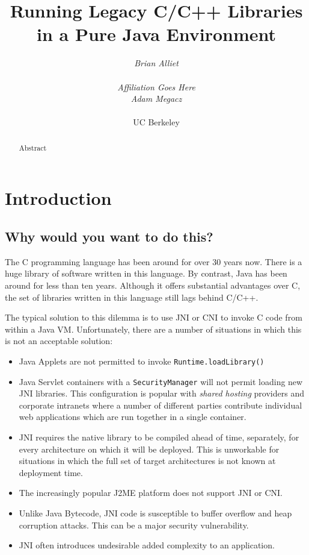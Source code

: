 \documentclass{acmconf}
\title{\textbf{\textsf{
Running Legacy C/C++ Libraries in a Pure Java Environment
}}}
\date{}
\author{\begin{tabular}{@{}c@{}}
        {\em {Brian Alliet}} \\ \\
        {{\it Affiliation Goes Here}}\relax
   \end{tabular}\hskip 1in\begin{tabular}{@{}c@{}}
        {\em {Adam Megacz}} \\ \\
        {UC Berkeley}\relax
\end{tabular}}
\begin{document}
\maketitle

\begin{abstract}
Abstract
\end{abstract}

\section{Introduction}

\subsection{Why would you want to do this?}

The C programming language has been around for over 30 years now.
There is a huge library of software written in this language.  By
contrast, Java has been around for less than ten years.  Although it
offers substantial advantages over C, the set of libraries written in
this language still lags behind C/C++.

The typical solution to this dilemma is to use JNI or CNI to invoke C
code from within a Java VM.  Unfortunately, there are a number of
situations in which this is not an acceptable solution:

\begin{itemize}
\item Java Applets are not permitted to invoke {\tt Runtime.loadLibrary()}
\item Java Servlet containers with a {\tt SecurityManager} will not
      permit loading new JNI libraries.  This configuration is popular
      with {\it shared hosting} providers and corporate intranets
      where a number of different parties contribute individual web
      applications which are run together in a single container.
\item JNI requires the native library to be compiled ahead of time,
      separately, for every architecture on which it will be deployed.
      This is unworkable for situations in which the full set of
      target architectures is not known at deployment time.
\item The increasingly popular J2ME platform does not support JNI or CNI.
\item Unlike Java Bytecode, JNI code is susceptible to buffer overflow
      and heap corruption attacks.  This can be a major security
      vulnerability.
\item JNI often introduces undesirable added complexity to an
      application.
\end{itemize}
\end{document}
